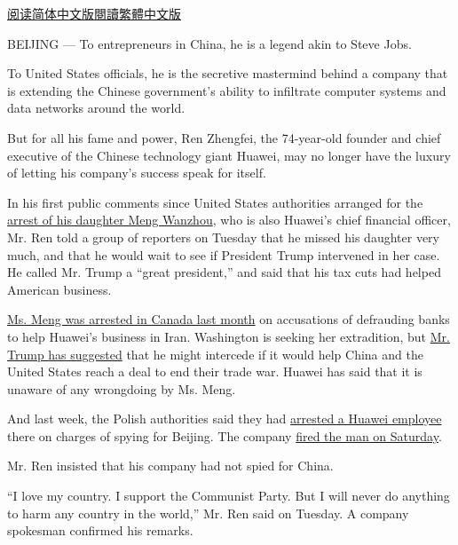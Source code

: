 \href{https://cn.nytimes.com/technology/20190116/huawei-ren-zhengfei/}{阅读简体中文版}\href{https://cn.nytimes.com/technology/20190116/huawei-ren-zhengfei/zh-hant/}{閱讀繁體中文版}

BEIJING --- To entrepreneurs in China, he is a legend akin to Steve
Jobs.

To United States officials, he is the secretive mastermind behind a
company that is extending the Chinese government's ability to infiltrate
computer systems and data networks around the world.

But for all his fame and power, Ren Zhengfei, the 74-year-old founder
and chief executive of the Chinese technology giant Huawei, may no
longer have the luxury of letting his company's success speak for
itself.

In his first public comments since United States authorities arranged
for the
\href{https://www.nytimes.com/2018/12/05/business/huawei-cfo-arrest-canada-extradition.html}{arrest
of his daughter Meng Wanzhou}, who is also Huawei's chief financial
officer, Mr. Ren told a group of reporters on Tuesday that he missed his
daughter very much, and that he would wait to see if President Trump
intervened in her case. He called Mr. Trump a ``great president,'' and
said that his tax cuts had helped American business.

\href{https://www.nytimes.com/2018/12/05/business/huawei-cfo-arrest-canada-extradition.html}{Ms.
Meng was arrested in Canada last month} on accusations of defrauding
banks to help Huawei's business in Iran. Washington is seeking her
extradition, but
\href{https://www.nytimes.com/2018/12/12/us/politics/trump-meng-wanzhou-huawei-extradition.html}{Mr.
Trump has suggested} that he might intercede if it would help China and
the United States reach a deal to end their trade war. Huawei has said
that it is unaware of any wrongdoing by Ms. Meng.

And last week, the Polish authorities said they had
\href{https://www.nytimes.com/2019/01/11/world/europe/poland-china-huawei-spy.html}{arrested
a Huawei employee} there on charges of spying for Beijing. The company
\href{https://www.nytimes.com/2019/01/12/world/asia/huawei-wang-weijing-poland.html}{fired
the man on Saturday}.

Mr. Ren insisted that his company had not spied for China.

``I love my country. I support the Communist Party. But I will never do
anything to harm any country in the world,'' Mr. Ren said on Tuesday. A
company spokesman confirmed his remarks.

